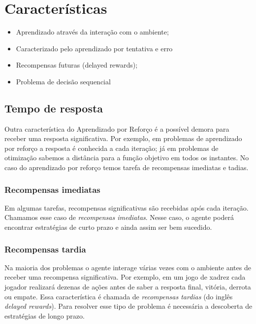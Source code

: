 \documentclass{article}
\begin{document}
    \section{Características}
    
        \begin{itemize}
            \item Aprendizado através da interação com o ambiente;
            \item Caracterizado pelo aprendizado por tentativa e erro
            \item Recompensas futuras (delayed rewards);
            \item Problema de decisão sequencial
        \end{itemize}
        
        \subsection{Tempo de resposta}
        
            Outra característica do Aprendizado por Reforço é a possível demora para receber uma resposta significativa. Por exemplo, em problemas de aprendizado por reforço a resposta é conhecida a cada iteração; já em problemas de otimização sabemos a distância para a função objetivo em todos os instantes. No caso do aprendizado por reforço temos tarefa de recompensas imediatas e tadias.
        
            \subsubsection{Recompensas imediatas}
        
                Em algumas tarefas, recompensas significativas são recebidas após cada iteração. Chamamos esse caso de \emph{recompensas imediatas}. Nesse caso, o agente poderá encontrar estratégias de curto prazo e ainda assim ser bem sucedido.
        
            \subsubsection{Recompensas tardia}
        
                Na maioria dos problemas o agente interage várias vezes com o ambiente antes de receber uma recompensa significativa. Por exemplo, em um jogo de xadrez cada jogador realizará dezenas de ações antes de saber a resposta final, vitória, derrota ou empate. Essa característica é chamada de \emph{recompensas tardias} (do inglês \emph{delayed rewards}). Para resolver esse tipo de problema é necessária a descoberta de estratégias de longo prazo.
        
\end{document}
